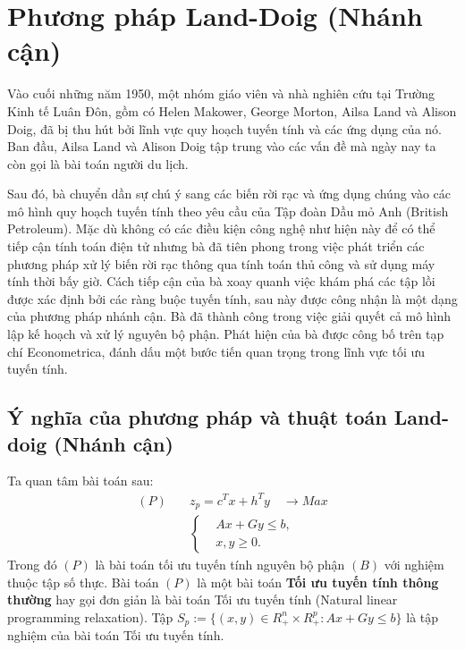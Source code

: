 \documentclass[12pt,a4paper]{report}
\begin{document}
\section{Phương pháp Land-Doig (Nhánh cận)}

Vào cuối những năm 1950, một nhóm giáo viên và nhà nghiên cứu tại Trường Kinh tế Luân Đôn, gồm có Helen Makower, George Morton, Ailsa Land và Alison Doig, đã bị thu hút bởi lĩnh vực quy hoạch tuyến tính và các ứng dụng của nó. Ban đầu, Ailsa Land và Alison Doig tập trung vào các vấn đề mà ngày nay ta còn gọi là bài toán người du lịch.

Sau đó, bà chuyển dần sự chú ý sang các biến rời rạc và ứng dụng chúng vào các mô hình quy hoạch tuyến tính theo yêu cầu của Tập đoàn Dầu mỏ Anh (British Petroleum). Mặc dù không có các điều kiện công nghệ như hiện này để có thể tiếp cận tính toán điện tử nhưng bà đã tiên phong trong việc phát triển các phương pháp xử lý biến rời rạc thông qua tính toán thủ công và sử dụng máy tính thời bấy giờ. Cách tiếp cận của bà xoay quanh việc khám phá các tập lồi được xác định bởi các ràng buộc tuyến tính, sau này được công nhận là một dạng của phương pháp nhánh cận. Bà đã thành công trong việc giải quyết cả mô hình lập kế hoạch và xử lý nguyên bộ phận. Phát hiện của bà được công bố trên tạp chí Econometrica, đánh dấu một bước tiến quan trọng trong lĩnh vực tối ưu tuyến tính. \cite{Land1960AnAM}


\subsection{Ý nghĩa của phương pháp và thuật toán Land-doig (Nhánh cận)}

Ta quan tâm bài toán sau:
\begin{equation}\label{P}
\begin{split}
(P) \quad & z_p=c^Tx+h^Ty \quad \longrightarrow Max \\
            & \left\{\begin{split}
                &Ax+Gy \leq  b, \\
                &x,y \geq 0.
            \end{split}\right.    
\end{split}
\end{equation}
Trong đó $(P)$ là bài toán tối ưu tuyến tính nguyên bộ phận $(B)$ với nghiệm thuộc tập số thực.
Bài toán $(P)$ là một bài toán \textbf{Tối ưu tuyến tính thông thường} hay gọi đơn giản là bài toán Tối ưu tuyến tính (Natural linear programming relaxation).
Tập $S_p:=\{(x,y)\in R^n_+\times R^p_+: Ax+Gy\leq b\}$ là tập nghiệm của bài toán Tối ưu tuyến tính.
\end{document}
